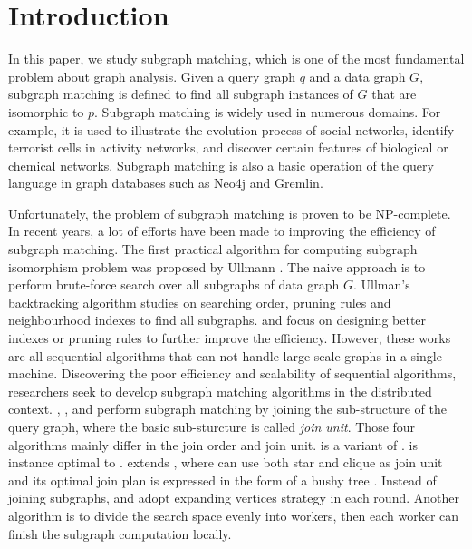 \section{Introduction}
\label{sec:intro}
In this paper, we study subgraph matching, which is one of the most fundamental problem about graph analysis. Given a query graph $q$ and a data graph $G$, subgraph matching is defined to find all subgraph instances of $G$ that are isomorphic to $p$. Subgraph matching is widely used in numerous domains. For example, it is used to illustrate the evolution process of social networks\cite{kairam2012life}, identify terrorist cells in activity networks\cite{cook2006mining}, and discover certain features of biological or chemical networks\cite{Cannataro2010}. Subgraph matching is also a basic operation of the query language in graph databases such as Neo4j\cite{neo4j} and Gremlin\cite{gremlin}.

 Unfortunately, the problem of subgraph matching is proven to be NP-complete\cite{Shamir97}. In recent years, a lot of efforts have been made to improving the efficiency of subgraph matching. The first practical algorithm for computing subgraph isomorphism problem was proposed by Ullmann \cite{Ullmann1976}. The naive approach is to perform brute-force search over all subgraphs of data graph $G$. Ullman's backtracking algorithm studies on searching order, pruning rules and neighbourhood indexes to find all subgraphs. \vftwo \cite{cordella2004sub} and \quicksi \cite{Shang2008} focus on designing better indexes or pruning rules to further improve the efficiency. However, these works are all sequential algorithms that can not handle large scale graphs in a single machine. Discovering the poor efficiency and scalability of sequential algorithms, researchers seek to develop subgraph matching algorithms in the distributed context.
\psgl \cite{Shao2014}, \starjoin \cite{Sun2012}, \ttjoin \cite{Lai2015} and \cliquejoin \cite{Lai2016} perform subgraph matching by joining the sub-structure of the query graph, where the basic sub-sturcture is called \textit{join unit}. Those four algorithms mainly differ in the join order and join unit. \psgl is a variant of \starjoin. \ttjoin is instance optimal to \starjoin. \cliquejoin extends \starjoin, where \cliquejoin can use both star and clique as join unit and its optimal join plan is expressed in the form of a bushy tree \cite{tree}. Instead of joining subgraphs, \bigjoin \cite{Ammar2018} and \crystaljoin \cite{qiao2017subgraph} adopt expanding vertices strategy in each round. Another algorithm \multiwayjoin \cite{AfratiFU13} is to divide the search space evenly into workers, then each worker can finish the subgraph computation locally. 

